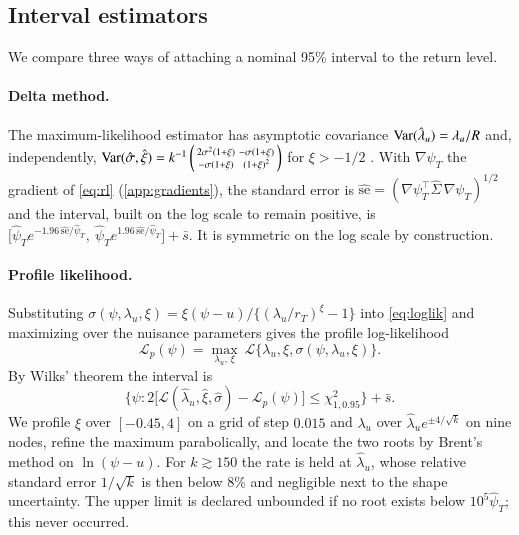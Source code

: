 \subsection{Interval estimators}\label{sec:intervals}

We compare three ways of attaching a nominal 95\% interval to the return level.

\paragraph{Delta method.} The maximum-likelihood estimator has asymptotic covariance $\operatorname{Var}(\hat\lambda_u) = \lambda_u/R$ and, independently, $\operatorname{Var}(\hat\sigma,\hat\xi) = k^{-1}\left(\begin{smallmatrix} 2\sigma^2(1+\xi) & -\sigma(1+\xi) \\ -\sigma(1+\xi) & (1+\xi)^2 \end{smallmatrix}\right)$ for $\xi > -1/2$ \citep{smith1987}. With $\nabla\psi_T$ the gradient of \cref{eq:rl} (\cref{app:gradients}), the standard error is $\widehat{\mathrm{se}} = (\nabla\psi_T^\top \widehat\Sigma\, \nabla\psi_T)^{1/2}$ and the interval, built on the log scale to remain positive, is $\big[\hat\psi_T e^{-1.96\,\widehat{\mathrm{se}}/\hat\psi_T},\ \hat\psi_T e^{1.96\,\widehat{\mathrm{se}}/\hat\psi_T}\big] + \bar s$. It is symmetric on the log scale by construction.

\paragraph{Profile likelihood.} Substituting $\sigma(\psi,\lambda_u,\xi) = \xi(\psi-u)/\{(\lambda_u/r_T)^{\xi}-1\}$ into \cref{eq:loglik} and maximizing over the nuisance parameters gives the profile log-likelihood
\[
\mathcal{L}_p(\psi) = \max_{\lambda_u,\,\xi}\ \mathcal{L}\{\lambda_u,\xi,\sigma(\psi,\lambda_u,\xi)\}.
\]
By Wilks' theorem \citep{wilks1938} the interval is
\begin{equation}\label{eq:profile}
\Big\{\psi : 2\big[\mathcal{L}(\hat\lambda_u,\hat\xi,\hat\sigma) - \mathcal{L}_p(\psi)\big] \le \chi^2_{1,0.95}\Big\} + \bar s .
\end{equation}
We profile $\xi$ over $[-0.45, 4]$ on a grid of step $0.015$ and $\lambda_u$ over $\hat\lambda_u e^{\pm 4/\sqrt{k}}$ on nine nodes, refine the maximum parabolically, and locate the two roots by Brent's method on $\ln(\psi-u)$. For $k \gtrsim 150$ the rate is held at $\hat\lambda_u$, whose relative standard error $1/\sqrt{k}$ is then below 8\% and negligible next to the shape uncertainty. The upper limit is declared unbounded if no root exists below $10^5\hat\psi_T$; this never occurred.

